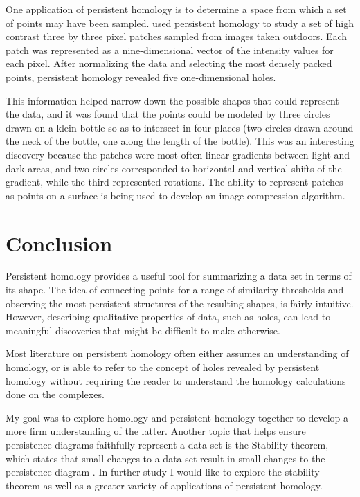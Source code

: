 One application of persistent homology is to determine a space from which a set of points may have been sampled.
\citet{carlssonb} used persistent homology to study a set of high contrast three by three pixel patches sampled from images taken outdoors.
Each patch was represented as a nine-dimensional vector of the intensity values for each pixel.
After normalizing the data and selecting the most densely packed points, persistent homology revealed five one-dimensional holes.

This information helped narrow down the possible shapes that could represent the data, and it was found that the points could be modeled by three circles drawn on a klein bottle so as to intersect in four places (two circles drawn around the neck of the bottle, one along the length of the bottle).
This was an interesting discovery because the patches were most often linear gradients between light and dark areas, and two circles corresponded to horizontal and vertical shifts of the gradient, while the third represented rotations.
The ability to represent patches as points on a surface is being used to develop an image compression algorithm.

\section{Conclusion}\label{sec:conclusion}

Persistent homology provides a useful tool for summarizing a data set in terms of its shape.
The idea of connecting points for a range of similarity thresholds and observing the most persistent structures of the resulting shapes, is fairly intuitive.
However, describing qualitative properties of data, such as holes, can lead to meaningful discoveries that might be difficult to make otherwise.

Most literature on persistent homology often either assumes an understanding of homology, or is able to refer to the concept of holes revealed by persistent homology without requiring the reader to understand the homology calculations done on the complexes.

My goal was to explore homology and persistent homology together to develop a more firm understanding of the latter.
Another topic that helps ensure persistence diagrams faithfully represent a data set is the Stability theorem, which states that small changes to a data set result in small changes to the persistence diagram \cite{cohen-steiner, wagner}.
In further study I would like to explore the stability theorem as well as a greater variety of applications of persistent homology.





